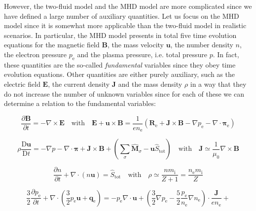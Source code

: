 \vspace*{2.5pt}

\quad However, the two-fluid model and the MHD model are more complicated since we have defined a large number of auxiliary quantities. Let us focus on the MHD model since it is somewhat more applicable than the two-fluid model in realistic scenarios. In particular, the MHD model presents in total five time evolution equations for the magnetic field $\mathbf{B}$, the mass velocity $\mathbf{u}$, the number density $n$, the electron pressure $p_{\mathrm{e}}$ and the plasma pressure, i.e. total pressure $p$. In fact, these quantities are the so-called \textit{fundamental} variables since they obey time evolution equations. Other quantities are either purely auxiliary, such as the electric field $\mathbf{E}$, the current density $\mathbf{J}$ and the mass density $\rho$ in a way that they do not increase the number of unknown variables since for each of these we can determine a relation to the fundamental variables:

\begin{equation}
    \label{comp-25}
    \frac{\partial \mathbf{B}}{\partial t}=-\nabla\times \mathbf{E}\quad\text{with}\quad\mathbf{E}+\mathbf{u}\times \mathbf{B} = \frac{1}{en_{\mathrm{e}}}\left(\mathbf{R}_{\mathrm{e}}+\mathbf{J}\times \mathbf{B}-\nabla p_{\mathrm{e}}-\nabla\cdot \boldsymbol{\pi}_{\mathrm{e}}\right)
\end{equation}

\begin{equation}
    \label{comp-26}
    \rho \frac{\mathrm{D}\mathbf{u}}{\mathrm{D}t}=-\nabla p - \nabla\cdot\boldsymbol{\pi} + \mathbf{J}\times \mathbf{B} + \left(\sum_{\sigma} \mathbf{\hat{M}}_\sigma - \mathbf{u}\hat{S}_{\mathrm{tot}}\right)\quad\text{with}\quad \mathbf{J}\simeq \frac{1}{\mu_0}\nabla \times \mathbf{B}
\end{equation}

\begin{equation}
    \label{comp-27}
    \frac{\partial n}{\partial t}+\nabla\cdot \left(n \mathbf{u}\right)=\hat{S}_{\mathrm{tot}}\quad\text{with}\quad \rho\simeq \frac{n m_{\mathrm{i}}}{Z+1}=\frac{n_{\mathrm{e}}m_{\mathrm{i}}}{Z}
\end{equation}

\begin{equation*}
    \frac{3}{2}\frac{\partial p_{\mathrm{e}}}{\partial t}+\nabla\cdot \left(\frac{3}{2}p_{\mathrm{e}}\mathbf{u}+\mathbf{q}_{\mathrm{e}}\right)=-p_{\mathrm{e}}\nabla\cdot \mathbf{u}+\left(\frac{3}{2}\nabla p_{\mathrm{e}}-\frac{5}{2}\frac{p_{\mathrm{e}}}{n_{\mathrm{e}}}\nabla n_{\mathrm{e}}\right)\cdot \frac{\mathbf{J}}{en_{\mathrm{e}}}+
\end{equation*}

